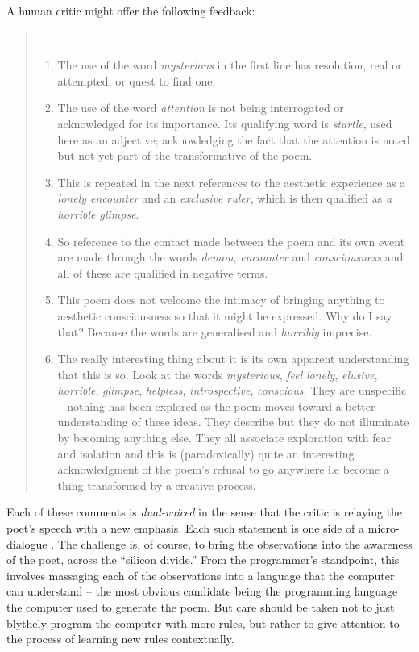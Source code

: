 A human critic might offer the following feedback:

\begin{quotation}
~\vspace{-1\baselineskip}
\begin{enumerate}
\item The use of the word \emph{mysterious} in the first line has
  resolution, real or attempted, or quest to find one.
%
\item The use of the word \emph{attention} is not being interrogated
  or acknowledged for its importance.  Its qualifying word is
  \emph{startle}, used here as an adjective; acknowledging the fact
  that the attention is noted but not yet part of the transformative
  of the poem.
%
\item This is repeated in the next references to the aesthetic
  experience as a \emph{lonely encounter} and an \emph{exclusive
    ruler}, which is then qualified as \emph{a horrible glimpse}.
%
\item So reference to the contact made between the poem and its own
  event are made through the words \emph{demon}, \emph{encounter} and
  \emph{consciousness} and all of these are qualified in negative
  terms.
%
\item This poem does not welcome the intimacy of bringing anything to
  aesthetic consciousness so that it might be expressed. Why do I say
  that? Because the words are generalised and \emph{horribly}
  imprecise.
%
\item The really interesting thing about it is its own apparent
  understanding that this is so.  Look at the words \emph{mysterious},
  \emph{feel} \emph{lonely}, \emph{elusive}, \emph{horrible},
  \emph{glimpse}, \emph{helpless}, \emph{introspective},
  \emph{conscious}. They are unspecific -- nothing has been explored
  as the poem moves toward a better understanding of these ideas. They
  describe but they do not illuminate by becoming anything else. They
  all associate exploration with fear and isolation and this is
  (paradoxically) quite an interesting acknowledgment of the poem’s
  refusal to go anywhere i.e become a thing transformed by a creative
  process.
\end{enumerate}
\end{quotation}

Each of these comments is \emph{dual-voiced} in the sense that the
critic is relaying the poet's speech with a new emphasis.  Each such
statement is one side of a micro-dialogue
\cite[p. 73]{bakhtin1984problems}.  The challenge is, of course, to
bring the observations into the awareness of the poet, across the
``silicon divide.''  From the programmer's standpoint, this involves
massaging each of the observations into a language that the computer
can understand -- the most obvious candidate being the programming
language the computer used to generate the poem.  But care should be
taken not to just blythely program the computer with more rules, but
rather to give attention to the process of learning new rules
contextually.

